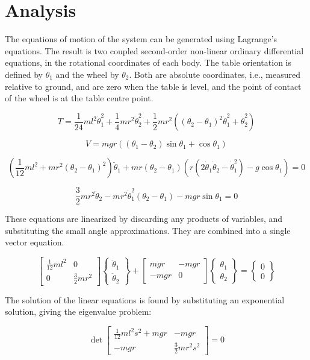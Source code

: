 \section*{Analysis}

The equations of motion of the system can be generated using Lagrange's equations.  The result is two coupled second-order non-linear ordinary differential equations, in the rotational coordinates of each body.  The table orientation is defined by $\theta_1$ and the wheel by $\theta_2$.  Both are absolute coordinates, i.e., measured relative to ground, and are zero when the table is level, and the point of contact of the wheel is at the table centre point.

\begin{equation}
T=\frac{1}{24}ml^2\dot{\theta}_1^2+\frac{1}{4}mr^2\dot{\theta}_2^2+\frac{1}{2}mr^2((\theta_2-\theta_1)^2 \dot{\theta}_1^2+\dot\theta_2^2)
\end{equation}

\begin{equation}
V=mgr((\theta_1-\theta_2)\sin\theta_1+\cos\theta_1)
\end{equation}

\begin{equation}
\left(\frac{1}{12}ml^2+mr^2(\theta_2-\theta_1)^2\right)\ddot{\theta}_1+mr(\theta_2-\theta_1)\left(r(2\dot{\theta}_1\dot{\theta}_2 - \dot{\theta}_1^2) -g\cos\theta_1\right)=0
\end{equation}

\begin{equation}
 \frac{3}{2}mr^2\ddot{\theta}_2-mr^2\dot{\theta}_1^2(\theta_2-\theta_1)-mgr\sin\theta_1=0
\end{equation}

These equations are linearized by discarding any products of variables, and substituting the small angle approximations.  They are combined into a single vector equation.

\begin{equation}
 \begin{bmatrix}
\frac{1}{12}ml^2 & 0\\
 0 & \frac{3}{2}mr^2
\end{bmatrix}
\begin{Bmatrix}
 \ddot{\theta}_1 \\
 \ddot{\theta}_2
\end{Bmatrix}
+
\begin{bmatrix}
 mgr & -mgr\\
 -mgr & 0  
\end{bmatrix}
\begin{Bmatrix}
 \theta_1 \\
 \theta_2
\end{Bmatrix}
=
\begin{Bmatrix}
 0\\
 0
\end{Bmatrix}
\end{equation}

The solution of the linear equations is found by substituting an exponential solution, giving the eigenvalue problem:

\begin{equation}
\det
\begin{bmatrix}
\frac{1}{12}ml^2s^2 +mgr& -mgr\\
-mgr & \frac{3}{2}mr^2s^2
\end{bmatrix}
=0
\end{equation}

